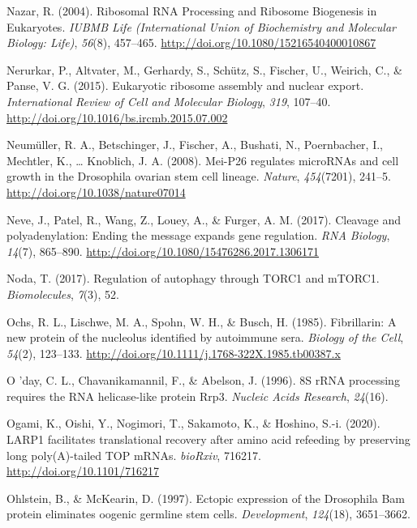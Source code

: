 \documentclass[12pt,oneside]{reedthesis}
\newlength{\cslhangindent}
\newenvironment{cslreferences}%
  {\setlength{\parindent}{0pt}%
  \everypar{\setlength{\hangindent}{\cslhangindent}}\ignorespaces}%
  {\par}
\begin{document}
\begin{cslreferences}
\leavevmode\hypertarget{ref-Nazar2004a}{}%
Nazar, R. (2004). Ribosomal RNA Processing and Ribosome Biogenesis in Eukaryotes. \emph{IUBMB Life (International Union of Biochemistry and Molecular Biology: Life)}, \emph{56}(8), 457--465. \url{http://doi.org/10.1080/15216540400010867}

\leavevmode\hypertarget{ref-nerurkarEukaryoticRibosomeAssembly2015}{}%
Nerurkar, P., Altvater, M., Gerhardy, S., Schütz, S., Fischer, U., Weirich, C., \& Panse, V. G. (2015). Eukaryotic ribosome assembly and nuclear export. \emph{International Review of Cell and Molecular Biology}, \emph{319}, 107--40. \url{http://doi.org/10.1016/bs.ircmb.2015.07.002}

\leavevmode\hypertarget{ref-Neumuller2008}{}%
Neumüller, R. A., Betschinger, J., Fischer, A., Bushati, N., Poernbacher, I., Mechtler, K., \ldots{} Knoblich, J. A. (2008). Mei-P26 regulates microRNAs and cell growth in the Drosophila ovarian stem cell lineage. \emph{Nature}, \emph{454}(7201), 241--5. \url{http://doi.org/10.1038/nature07014}

\leavevmode\hypertarget{ref-Neve2017i}{}%
Neve, J., Patel, R., Wang, Z., Louey, A., \& Furger, A. M. (2017). Cleavage and polyadenylation: Ending the message expands gene regulation. \emph{RNA Biology}, \emph{14}(7), 865--890. \url{http://doi.org/10.1080/15476286.2017.1306171}

\leavevmode\hypertarget{ref-Noda2017}{}%
Noda, T. (2017). Regulation of autophagy through TORC1 and mTORC1. \emph{Biomolecules}, \emph{7}(3), 52.

\leavevmode\hypertarget{ref-ochsFibrillarinNewProtein1985}{}%
Ochs, R. L., Lischwe, M. A., Spohn, W. H., \& Busch, H. (1985). Fibrillarin: A new protein of the nucleolus identified by autoimmune sera. \emph{Biology of the Cell}, \emph{54}(2), 123--133. \url{http://doi.org/10.1111/j.1768-322X.1985.tb00387.x}

\leavevmode\hypertarget{ref-oday8SRRNAProcessing1996}{}%
O 'day, C. L., Chavanikamannil, F., \& Abelson, J. (1996). 8S rRNA processing requires the RNA helicase-like protein Rrp3. \emph{Nucleic Acids Research}, \emph{24}(16).

\leavevmode\hypertarget{ref-ogamiLARP1FacilitatesTranslational2020}{}%
Ogami, K., Oishi, Y., Nogimori, T., Sakamoto, K., \& Hoshino, S.-i. (2020). LARP1 facilitates translational recovery after amino acid refeeding by preserving long poly(A)-tailed TOP mRNAs. \emph{bioRxiv}, 716217. \url{http://doi.org/10.1101/716217}

\leavevmode\hypertarget{ref-ohlsteinEctopicExpressionDrosophila1997}{}%
Ohlstein, B., \& McKearin, D. (1997). Ectopic expression of the Drosophila Bam protein eliminates oogenic germline stem cells. \emph{Development}, \emph{124}(18), 3651--3662.


\end{cslreferences}
\end{document}
